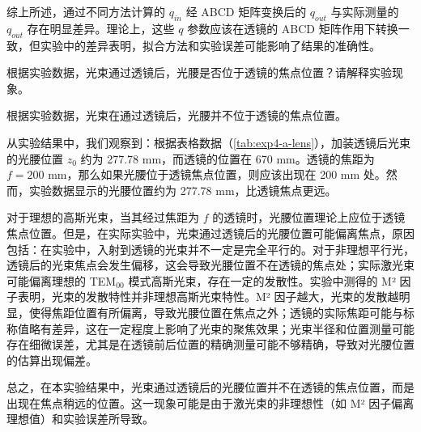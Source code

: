 综上所述，通过不同方法计算的 \( q_{in} \) 经 ABCD 矩阵变换后的 \( q_{out} \) 与实际测量的 \( q_{out} \) 存在明显差异。理论上，这些 \( q \) 参数应该在透镜的 ABCD 矩阵作用下转换一致，但实验中的差异表明，拟合方法和实验误差可能影响了结果的准确性。


\begin{question}
	根据实验数据，光束通过透镜后，光腰是否位于透镜的焦点位置？请解释实验现象。
\end{question}
根据实验数据，光束在通过透镜后，光腰并不位于透镜的焦点位置。

从实验结果中，我们观察到：根据表格数据（\cref{tab:exp4-a-lens}），加装透镜后光束的光腰位置 \( z_0 \) 约为 277.78 mm，而透镜的位置在 670 mm。透镜的焦距为 \( f = 200 \) mm，那么如果光腰位于透镜焦点位置，则应该出现在 200 mm 处。然而，实验数据显示的光腰位置约为 277.78 mm，比透镜焦点更远。

对于理想的高斯光束，当其经过焦距为 \( f \) 的透镜时，光腰位置理论上应位于透镜焦点位置。但是，在实际实验中，光束通过透镜后的光腰位置可能偏离焦点，原因包括：在实验中，入射到透镜的光束并不一定是完全平行的。对于非理想平行光，透镜后的光束焦点会发生偏移，这会导致光腰位置不在透镜的焦点处；实际激光束可能偏离理想的 TEM\(_{00}\) 模式高斯光束，存在一定的发散性。实验中测得的 M² 因子表明，光束的发散特性并非理想高斯光束特性。M² 因子越大，光束的发散越明显，使得焦距位置有所偏离，导致光腰位置在焦点之外；透镜的实际焦距可能与标称值略有差异，这在一定程度上影响了光束的聚焦效果；光束半径和位置测量可能存在细微误差，尤其是在透镜前后位置的精确测量可能不够精确，导致对光腰位置的估算出现偏差。

总之，在本实验结果中，光束通过透镜后的光腰位置并不在透镜的焦点位置，而是出现在焦点稍远的位置。这一现象可能是由于激光束的非理想性（如 M² 因子偏离理想值）和实验误差所导致。
